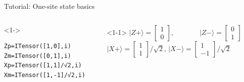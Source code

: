 \begin{frame}[fragile]{Tutorial: One-site state basics}

\begin{columns}

\begin{column}[T]{0.45\textwidth}
\begin{onlyenv}<1->
\begin{lstlisting}[language=JuliaLocal, style=julia, basicstyle=\scriptsize\ttfamily]
Zp=ITensor([1,0],i)
Zm=ITensor([0,1],i)
Xp=ITensor([1,1]/√2,i)
Xm=ITensor([1,-1]/√2,i)
\end{lstlisting}
\end{onlyenv}
\end{column}

\begin{column}[T]{0.6\textwidth}
\begin{onlyenv}<1-1>
$|Z+\rangle = \begin{bmatrix} 1 \\ 0 \end{bmatrix}$,
\ \ \ \ \ \ \  $|Z-\rangle = \begin{bmatrix} 0 \\ 1 \end{bmatrix}$ \\
$|X+\rangle = \begin{bmatrix} 1 \\ 1 \end{bmatrix}/\sqrt{2}$,
  $|X-\rangle = \begin{bmatrix} 1 \\ -1 \end{bmatrix}/\sqrt{2}$
\end{onlyenv}


\end{column}
\end{columns}
\end{frame}
